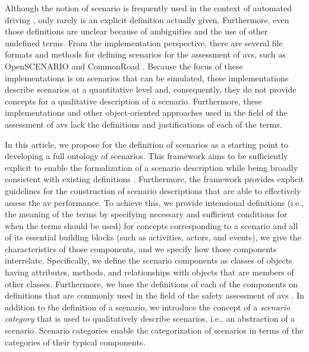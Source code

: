 Although the notion of scenario is frequently used in the context of automated driving \autocite{gietelink2006development, ebner2011identifying, hulshof2013autonomous, xiong2015orchestration, zofka2015datadrivetrafficscenarios, putz2017pegasus, roesener2017comprehensive, ploeg2017GCDC, shao2019evaluating}, \cendc\cstartd only rarely is an explicit definition actually given. 
Furthermore, even those definitions are unclear because of ambiguities and the use of other undefined terms. \cendd
\cstartc From the implementation perspective, there are several file formats and methods for defining scenarios for the assessment of \acp{av}, such as OpenSCENARIO \autocite{openscenario} and CommonRoad \autocite{althoff2017CommonRoad}.
Because the focus of these implementations is on scenarios that can be simulated, these implementations describe scenarios at a quantitative level and, consequently, they do not provide concepts for a qualitative description of a scenario.
Furthermore, these implementations and other object-oriented approaches used in the field of the assessment of \acp{av} \autocite{tsai2003scenario, utting2012taxonomy, zofka2016testing, wittmann2017method} lack the definitions and justifications of each of the terms.

In this article, we propose  for the definition of scenarios \cendc\cstartd as a starting point to developing a full ontology of scenarios. 
This framework aims to be sufficiently explicit to enable the formalization of a scenario description while being broadly consistent with existing definitions \autocite{geyer2014, ulbrich2015, elrofai2016scenario}. \cendd\cstartc 
Furthermore, the framework provides explicit guidelines for the construction of scenario descriptions that are able to effectively assess the \ac{av} performance.
To achieve this, \cendc\cstartd we provide intensional definitions (i.e., the meaning of the terms by specifying necessary and sufficient conditions for when the terms should be used) for concepts corresponding to a scenario and all of its \cendd\cstartc essential building blocks (such as activities, actors, and events), \cendc\cstartd we give \cendd\cstartc the characteristics of those components, and \cendc\cstartd we specify \cendd\cstartc how those components interrelate. 
\cendc\cstartd Specifically, we define the scenario components \cendd\cstartc as classes of objects having attributes, methods, and relationships with objects that are members of other classes.
\cendc\cstartd Furthermore, we base the definitions of each of the components on definitions \cendd\cstartc that are commonly used in the field of the safety assessment of \acp{av} \autocite{geyer2014, ulbrich2015, catapult2018musicc, catapult2018regulating, sigsim2019glossary, openscenario}. 
In addition to the definition of a scenario, we introduce the concept of a \emph{scenario category} that is used to qualitatively describe scenarios, i.e., an abstraction of a scenario. Scenario categories enable the categorization of scenarios in terms of the categories of their typical components.

